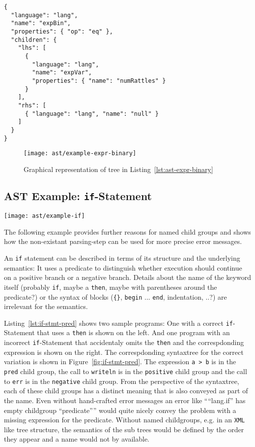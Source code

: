 \documentclass[sigconf,natbib=false]{acmart}
\newcommand{\enquote}[1]{``#1''}
\newcommand\astScale{0.7}
\begin{document}
\begin{lstlisting}[caption={AST for expression \texttt{numRattles == null}}, label=lst:ast-expr-binary]
{
  "language": "lang",
  "name": "expBin",
  "properties": { "op": "eq" },
  "children": {
    "lhs": [
      {
        "language": "lang",
        "name": "expVar",
        "properties": { "name": "numRattles" }
      }
    ],
    "rhs": [
      { "language": "lang", "name": "null" }
    ]
  }
}
\end{lstlisting}

\begin{figure}
  \texttt{[image: ast/example-expr-binary]}
  \caption{Graphical representation of tree in Listing~\ref{lst:ast-expr-binary}}
  \label{fig:ast-expr-binary}
\end{figure}


\subsection{AST Example: \texttt{if}-Statement}
\label{sec:ast-example-if}

\begin{figure*}
  \texttt{[image: ast/example-if]}
  \caption{\texttt{if}-Statement with predicate}
  \label{fig:if-stmt-pred}
\end{figure*}

The following example provides further reasons for named child groups and shows how the non-existant parsing-step can be used for more precise error messages.

An \texttt{if} statement can be described in terms of its structure and the underlying semantics: It uses a predicate to distinguish whether execution should continue on a positive branch or a negative branch. Details about the name of the keyword itself (probably \texttt{if}, maybe a \texttt{then}, maybe with parentheses around the predicate?) or the syntax of blocks (\texttt{\{\}}, \texttt{begin} ... \texttt{end}, indentation, ..?) are irrelevant for the semantics.


Listing~\ref{lst:if-stmt-pred} shows two sample programs: One with a correct \texttt{if}-Statement that uses a \texttt{then} is shown on the left. And one program with an incorrect \texttt{if}-Statement that accidentaly omits the \texttt{then} and the correspdonding expression is shown on the right. The correspdonding syntaxtree for the correct variation is shown in Figure~\ref{fig:if-stmt-pred}. The expression \texttt{a > b} is in the \texttt{pred} child group, the call to \texttt{writeln} is in the \texttt{positive} child group and the call to \texttt{err} is in the \texttt{negative} child group. From the perspective of the syntaxtree, each of these child groups has a distinct meaning that is also conveyed as part of the name. Even without hand-crafted error messages an error like \enquote{\enquote{lang.if} has empty childgroup \enquote{predicate}} would quite nicely convey the problem with a missing expression for the predicate. Without named childgroups, e.g. in an \texttt{XML} like tree structure, the semantics of the sub trees would be defined by the order they appear and a name would not by available.
\end{document}
